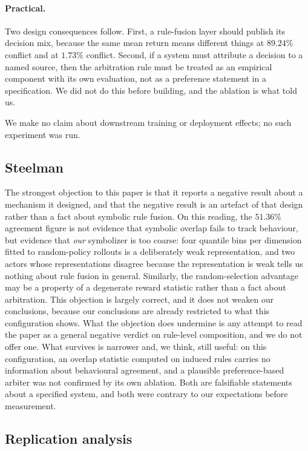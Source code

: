 \documentclass[11pt,a4paper]{article}
\begin{document}
\paragraph{Practical.} Two design consequences follow. First, a rule-fusion layer should publish its decision mix, because the same mean return means different things at $89.24\%$ conflict and at $1.73\%$ conflict. Second, if a system must attribute a decision to a named source, then the arbitration rule must be treated as an empirical component with its own evaluation, not as a preference statement in a specification. We did not do this before building, and the ablation is what told us.

We make no claim about downstream training or deployment effects; no such experiment was run.

\subsection{Steelman}

The strongest objection to this paper is that it reports a negative result about a mechanism it designed, and that the negative result is an artefact of that design rather than a fact about symbolic rule fusion. On this reading, the $51.36\%$ agreement figure is not evidence that symbolic overlap fails to track behaviour, but evidence that \emph{our} symbolizer is too coarse: four quantile bins per dimension fitted to random-policy rollouts is a deliberately weak representation, and two actors whose representations disagree because the representation is weak tells us nothing about rule fusion in general. Similarly, the random-selection advantage may be a property of a degenerate reward statistic rather than a fact about arbitration. This objection is largely correct, and it does not weaken our conclusions, because our conclusions are already restricted to what this configuration shows. What the objection does undermine is any attempt to read the paper as a general negative verdict on rule-level composition, and we do not offer one. What survives is narrower and, we think, still useful: on this configuration, an overlap statistic computed on induced rules carries no information about behavioural agreement, and a plausible preference-based arbiter was not confirmed by its own ablation. Both are falsifiable statements about a specified system, and both were contrary to our expectations before measurement.

\subsection{Replication analysis}
\end{document}
